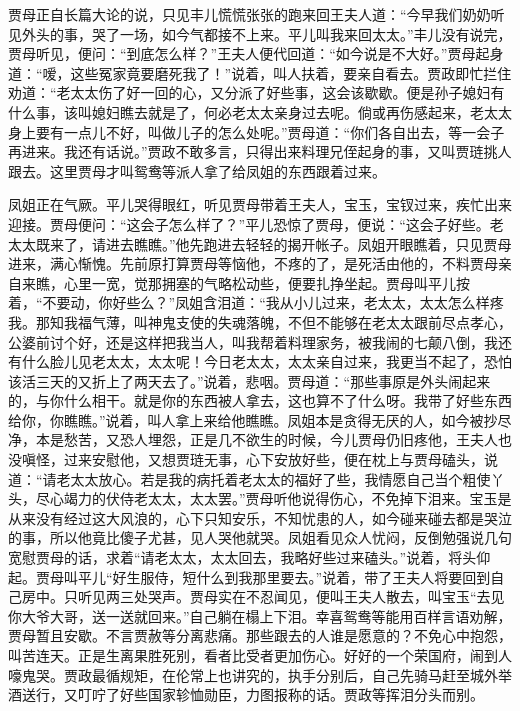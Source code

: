 \begin{parag}
    贾母正自长篇大论的说，只见丰儿慌慌张张的跑来回王夫人道：“今早我们奶奶听见外头的事，哭了一场，如今气都接不上来。平儿叫我来回太太。”丰儿没有说完，贾母听见，便问：“到底怎么样？”王夫人便代回道：“如今说是不大好。”贾母起身道：“嗳，这些冤家竟要磨死我了！”说着，叫人扶着，要亲自看去。贾政即忙拦住劝道：“老太太伤了好一回的心，又分派了好些事，这会该歇歇。便是孙子媳妇有什么事，该叫媳妇瞧去就是了，何必老太太亲身过去呢。倘或再伤感起来，老太太身上要有一点儿不好，叫做儿子的怎么处呢。”贾母道：“你们各自出去，等一会子再进来。我还有话说。”贾政不敢多言，只得出来料理兄侄起身的事，又叫贾琏挑人跟去。这里贾母才叫鸳鸯等派人拿了给凤姐的东西跟着过来。
\end{parag}


\begin{parag}
    凤姐正在气厥。平儿哭得眼红，听见贾母带着王夫人，宝玉，宝钗过来，疾忙出来迎接。贾母便问：“这会子怎么样了？”平儿恐惊了贾母，便说：“这会子好些。老太太既来了，请进去瞧瞧。”他先跑进去轻轻的揭开帐子。凤姐开眼瞧着，只见贾母进来，满心惭愧。先前原打算贾母等恼他，不疼的了，是死活由他的，不料贾母亲自来瞧，心里一宽，觉那拥塞的气略松动些，便要扎挣坐起。贾母叫平儿按着，“不要动，你好些么？”凤姐含泪道：“我从小儿过来，老太太，太太怎么样疼我。那知我福气薄，叫神鬼支使的失魂落魄，不但不能够在老太太跟前尽点孝心，公婆前讨个好，还是这样把我当人，叫我帮着料理家务，被我闹的七颠八倒，我还有什么脸儿见老太太，太太呢！今日老太太，太太亲自过来，我更当不起了，恐怕该活三天的又折上了两天去了。”说着，悲咽。贾母道：“那些事原是外头闹起来的，与你什么相干。就是你的东西被人拿去，这也算不了什么呀。我带了好些东西给你，你瞧瞧。”说着，叫人拿上来给他瞧瞧。凤姐本是贪得无厌的人，如今被抄尽净，本是愁苦，又恐人埋怨，正是几不欲生的时候，今儿贾母仍旧疼他，王夫人也没嗔怪，过来安慰他，又想贾琏无事，心下安放好些，便在枕上与贾母磕头，说道：“请老太太放心。若是我的病托着老太太的福好了些，我情愿自己当个粗使丫头，尽心竭力的伏侍老太太，太太罢。”贾母听他说得伤心，不免掉下泪来。宝玉是从来没有经过这大风浪的，心下只知安乐，不知忧患的人，如今碰来碰去都是哭泣的事，所以他竟比傻子尤甚，见人哭他就哭。凤姐看见众人忧闷，反倒勉强说几句宽慰贾母的话，求着“请老太太，太太回去，我略好些过来磕头。”说着，将头仰起。贾母叫平儿“好生服侍，短什么到我那里要去。”说着，带了王夫人将要回到自己房中。只听见两三处哭声。贾母实在不忍闻见，便叫王夫人散去，叫宝玉“去见你大爷大哥，送一送就回来。”自己躺在榻上下泪。幸喜鸳鸯等能用百样言语劝解，贾母暂且安歇。不言贾赦等分离悲痛。那些跟去的人谁是愿意的？不免心中抱怨，叫苦连天。正是生离果胜死别，看者比受者更加伤心。好好的一个荣国府，闹到人嚎鬼哭。贾政最循规矩，在伦常上也讲究的，执手分别后，自己先骑马赶至城外举酒送行，又叮咛了好些国家轸恤勋臣，力图报称的话。贾政等挥泪分头而别。
\end{parag}


